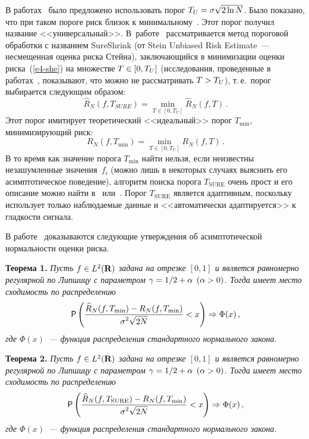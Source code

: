 \begin{multicols}{2}
В работах~\cite{2-she, 3-she} было предложено использовать порог $T_U\hm=\sigma\sqrt{2\ln N}$. Было показано, 
что при таком пороге риск близок к минимальному~\cite{2-she}. Этот порог получил название <<универсальный>>. 
В~работе~\cite{1-she} рассматривается метод пороговой обработки с названием SureShrink (от Stein Unbiased Risk Estimate~--- 
несмещенная оценка риска Стейна), заключающийся в минимизации оценки риска~(\ref{e4-she}) на множестве $T\hm\in[0,T_U]$ 
(исследования, проведенные в работах~\cite{1-she, 4-she}, показывают, что можно не рас\-смат\-ри\-вать $T\hm>T_U$), т.\,е.\
 порог выбирается следующим образом:
\begin{equation*}
\widehat{R}_N(f,T_{SURE})=\min\limits_{T\in[0,T_U]}\widehat{R}_N(f,T)\,. %
\end{equation*}
Этот порог имитирует теоретический <<идеальный>> порог $T_{\min}$, минимизирующий риск:
\begin{equation}
R_N(f,T_{\min})=\min\limits_{T\in[0,T_U]}R_N(f,T)\,.\label{e6-she}
\end{equation}
В то время как значение порога $T_{\min}$ найти нельзя, если неизвестны незашумленные значения~$f_i$ (можно лишь 
в некоторых случаях выяснить его асимптотическое поведение), алгоритм поиска порога $T_{\mathrm{SURE}}$ очень прост и его 
описание можно найти в~\cite{14-she} или~\cite{17-she}. Порог $T_{\mathrm{SURE}}$ является адаптивным, поскольку использует 
только наблюдаемые данные и <<автоматически адаптируется>> к гладкости сиг\-нала.

В работе~\cite{9-she} доказываются следующие утверж\-де\-ния об асимптотической нормальности оценки риска.

\smallskip

\noindent 
\textbf{Теорема 1.} \textit{Пусть $f\hm\in L^2(\mathbf{R})$ задана на отрезке $[0,1]$ и является равномерно 
регулярной по Липшицу с параметром $\gamma\hm={1}/{2}+\alpha$ $(\alpha\hm>0)$. Тогда имеет место сходимость по распределению
\begin{equation*}
{\sf P}\left(\fr{\widehat{R}_N(f,T_{\min})-R_N(f,T_{\min})}{\sigma^2\sqrt{2N}}<x\right)\Rightarrow\Phi(x)\,, %
\end{equation*}
где $\Phi(x)$~--- функция распределения стандартного нормального закона.}

\smallskip

\noindent
\textbf{Теорема 2.} \textit{Пусть $f\hm\in L^2(\mathbf{R})$ задана на отрезке $[0,1]$ и является равномерно 
регулярной по Липшицу с параметром $\gamma\hm={1}/{2}+\alpha$ $(\alpha\hm>0)$. Тогда имеет место сходимость по распределению
\begin{equation*}
{\sf P}\left(\fr{\widehat{R}_N(f,T_{\mathrm{SURE}})-R_N(f,T_{\min})}{\sigma^2\sqrt{2N}}<x\right)\Rightarrow\Phi(x)\,, %
\end{equation*}
где $\Phi(x)$~--- функция распределения стандартного нормального закона.}


\end{multicols}
